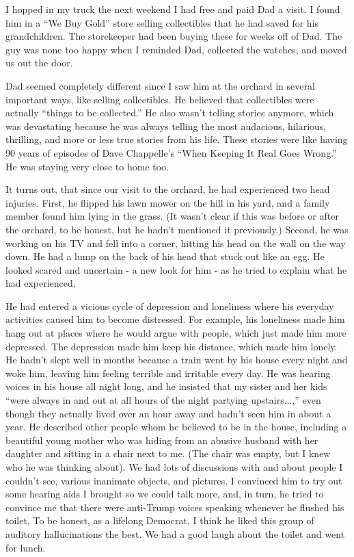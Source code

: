 \documentclass{article}
\begin{document}
I hopped in my truck the next weekend I had free and paid Dad a visit. I found him in a ``We Buy Gold'' store selling collectibles that he had saved for his grandchildren. The storekeeper had been buying these for weeks off of Dad. The guy was none too happy when I reminded Dad, collected the watches, and moved us out the door.

Dad seemed completely different since I saw him at the orchard in several important ways, like selling collectibles. He believed that collectibles were actually ``things to be collected.'' He also wasn't telling stories anymore, which was devastating because he was always telling the most audacious, hilarious, thrilling, and more or less true stories from his life. These stories were like having 90 years of episodes of Dave Chappelle's ``When Keeping It Real Goes Wrong.'' He was staying very close to home too.

It turns out, that since our visit to the orchard, he had experienced two head injuries. First, he flipped his lawn mower on the hill in his yard, and a family member found him lying in the grass. (It wasn't clear if this was before or after the orchard, to be honest, but he hadn't mentioned it previously.) Second, he was working on his TV and fell into a corner, hitting his head on the wall on the way down. He had a lump on the back of his head that stuck out like an egg. He looked scared and uncertain - a new look for him - as he tried to explain what he had experienced. 

He had entered a vicious cycle of depression and loneliness where his everyday activities caused him to become distressed. For example, his loneliness made him hang out at places where he would argue with people, which just made him more depressed. The depression made him keep his distance, which made him lonely. He hadn't slept well in months because a train went by his house every night and woke him, leaving him feeling terrible and irritable every day. He was hearing voices in his house all night long, and he insisted that my sister and her kids ``were always in and out at all hours of the night partying upstairs...,'' even though they actually lived over an hour away and hadn't seen him in about a year. He described other people whom he believed to be in the house, including a beautiful young mother who was hiding from an abusive husband with her daughter and sitting in a chair next to me. (The chair was empty, but I knew who he was thinking about).  We had lots of discussions with and about people I couldn't see, various inanimate objects, and pictures. I convinced him to try out some hearing aids I brought so we could talk more, and, in turn, he tried to convince me that there were anti-Trump voices speaking whenever he flushed his toilet. To be honest, as a lifelong Democrat, I think he liked this group of auditory hallucinations the best. We had a good laugh about the toilet and went for lunch.
\end{document}
